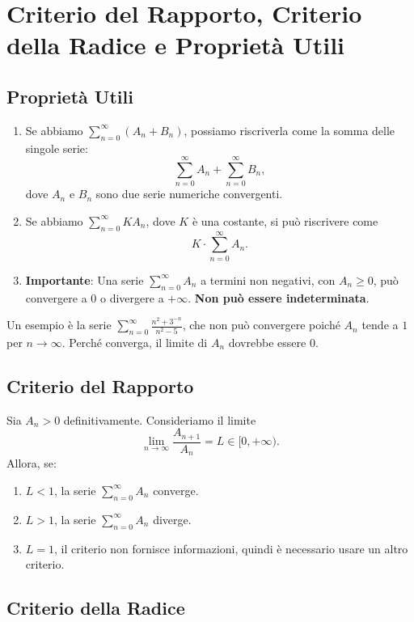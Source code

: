 \documentclass[12pt]{article}  %
\begin{document}
\section*{Criterio del Rapporto, Criterio della Radice e Proprietà Utili}

\subsection*{Proprietà Utili}

\begin{enumerate}
    \item Se abbiamo $\sum_{n=0}^{\infty} (A_n + B_n)$, possiamo riscriverla come la somma delle singole serie:
    \[
    \sum_{n=0}^{\infty} A_n + \sum_{n=0}^{\infty} B_n,
    \]
    dove $A_n$ e $B_n$ sono due serie numeriche convergenti.

    \item Se abbiamo $\sum_{n=0}^{\infty} K A_n$, dove $K$ è una costante, si può riscrivere come
    \[
    K \cdot \sum_{n=0}^{\infty} A_n.
    \]

    \item \textbf{Importante}: Una serie $\sum_{n=0}^{\infty} A_n$ a termini non negativi, con $A_n \geq 0$, può convergere a $0$ o divergere a $+\infty$. \textbf{Non può essere indeterminata}.
\end{enumerate}

Un esempio è la serie $\sum_{n=0}^{\infty} \frac{n^2 + 3^{-n}}{n^2 - 5}$, che non può convergere poiché $A_n$ tende a $1$ per $n \to \infty$. Perché converga, il limite di $A_n$ dovrebbe essere $0$.

\subsection*{Criterio del Rapporto}

Sia $A_n > 0$ definitivamente. Consideriamo il limite
\[
\lim_{n \to \infty} \frac{A_{n+1}}{A_n} = L \in [0, +\infty).
\]
Allora, se:
\begin{enumerate}
    \item $L < 1$, la serie $\sum_{n=0}^{\infty} A_n$ converge.
    \item $L > 1$, la serie $\sum_{n=0}^{\infty} A_n$ diverge.
    \item $L = 1$, il criterio non fornisce informazioni, quindi è necessario usare un altro criterio.
\end{enumerate}

\subsection*{Criterio della Radice}
\end{document}
